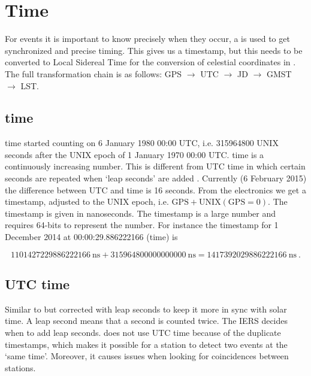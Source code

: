 \section{Time}
\label{sec:time}

For \hisparc events it is important to know precisely when they occur, a
\gps is used to get synchronized and precise timing. This gives us a
timestamp, but this needs to be converted to Local Sidereal Time for the
conversion of celestial coordinates in . The full
transformation chain is as follows: GPS $\to$ UTC $\to$ JD $\to$ GMST
$\to$ LST.


\subsection{\gps time}

\gps time started counting on 6 January 1980 00:00 UTC, i.e.
\num{315964800} UNIX seconds after the UNIX epoch of 1 January 1970
00:00 UTC. \gps time is a continuously increasing number. This is
different from UTC time in which certain seconds are repeated when `leap
seconds' are added \cite{usno:2012aa}. Currently (6 February 2015) the
difference between UTC and \gps time is 16 seconds. From the \hisparc
electronics we get a \gps timestamp, adjusted to the UNIX epoch, i.e.
$\mathrm{GPS} + \mathrm{UNIX(GPS=0)}$. The timestamp is given in
nanoseconds. The \gps timestamp is a large number and requires 64-bits
to represent the number. For instance the \gps timestamp for 1 December
2014 at 00:00:29.886222166 (\gps time) is

\begin{equation}
    \SI{1101427229886222166}{\nano\second} +
        \SI{315964800000000000}{\nano\second} =
        \SI{1417392029886222166}{\nano\second} \ .
\end{equation}


\subsection{UTC time}

Similar to \gps but corrected with leap seconds to keep it more in sync
with solar time. A leap second means that a second is counted twice. The
IERS decides when to add leap seconds. \hisparc does not use UTC time
because of the duplicate timestamps, which makes it possible for a
station to detect two events at the `same time'. Moreover, it causes
issues when looking for coincidences between stations.


